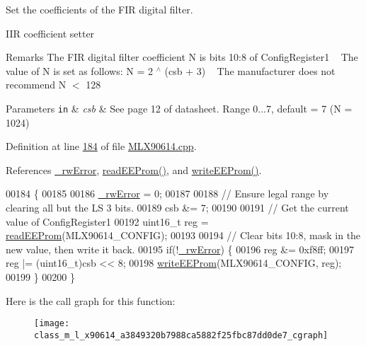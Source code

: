 Set the coefficients of the F\+IR digital filter. 

I\+IR coefficient setter

\begin{DoxyRemark}{Remarks}
The F\+IR digital filter coefficient N is bits 10\+:8 of Config\+Register1 ~\newline
 The value of N is set as follows\+: {\ttfamily N = 2 $^\wedge$ (csb + 3)} ~\newline
 The manufacturer does not recommend {\ttfamily N $<$ 128} 
\end{DoxyRemark}

\begin{DoxyParams}[1]{Parameters}
\mbox{\tt in}  & {\em csb} & See page 12 of datasheet. Range 0...7, default = 7 (N = 1024) \\
\hline
\end{DoxyParams}


Definition at line \mbox{\hyperlink{_m_l_x90614_8cpp_source_l00184}{184}} of file \mbox{\hyperlink{_m_l_x90614_8cpp_source}{M\+L\+X90614.\+cpp}}.



References \mbox{\hyperlink{_m_l_x90614_8h_source_l00146}{\+\_\+rw\+Error}}, \mbox{\hyperlink{_m_l_x90614_8cpp_source_l00344}{read\+E\+E\+Prom()}}, and \mbox{\hyperlink{_m_l_x90614_8cpp_source_l00354}{write\+E\+E\+Prom()}}.


\begin{DoxyCode}
00184                                       \{
00185 
00186     \mbox{\hyperlink{class_m_l_x90614_a8c203cc9359c283d07682ba7dbcc5de3}{\_rwError}} = 0;
00187 
00188     \textcolor{comment}{// Ensure legal range by clearing all but the LS 3 bits.}
00189     csb &= 7;
00190 
00191     \textcolor{comment}{// Get the current value of ConfigRegister1}
00192     uint16\_t reg = \mbox{\hyperlink{class_m_l_x90614_aab0a010875527f4ac3d2794017624b10}{readEEProm}}(MLX90614\_CONFIG);
00193 
00194     \textcolor{comment}{// Clear bits 10:8, mask in the new value, then write it back.}
00195     \textcolor{keywordflow}{if}(!\mbox{\hyperlink{class_m_l_x90614_a8c203cc9359c283d07682ba7dbcc5de3}{\_rwError}}) \{
00196         reg &= 0xf8ff;
00197         reg |= (uint16\_t)csb << 8;
00198         \mbox{\hyperlink{class_m_l_x90614_a70b3e428c623b6af5bedf199f5c16490}{writeEEProm}}(MLX90614\_CONFIG, reg);
00199     \}
00200 \}
\end{DoxyCode}
Here is the call graph for this function\+:\nopagebreak
\begin{figure}[H]
\begin{center}
\leavevmode
\texttt{[image: class\_m\_l\_x90614\_a3849320b7988ca5882f25fbc87dd0de7\_cgraph]}
\end{center}
\end{figure}
\mbox{\label{class_m_l_x90614_af62b9d897164375e8c17fb5a8d367600}} 
